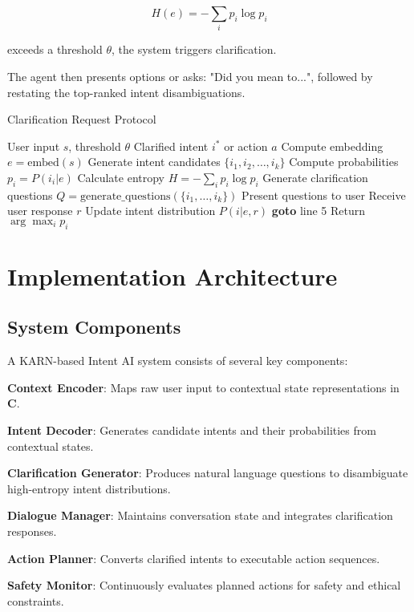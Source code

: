 \documentclass[12pt]{article}
\begin{document}
$$H(e) = -\sum_i p_i \log p_i$$

exceeds a threshold $\theta$, the system triggers clarification.

The agent then presents options or asks: "Did you mean to...", followed by restating the top-ranked intent disambiguations.

\begin{algorithm}
\caption{Clarification Request Protocol}
\begin{algorithmic}[1]
\REQUIRE User input $s$, threshold $\theta$
\ENSURE Clarified intent $i^*$ or action $a$
\STATE Compute embedding $e = \text{embed}(s)$
\STATE Generate intent candidates $\{i_1, i_2, \ldots, i_k\}$
\STATE Compute probabilities $p_i = P(i_i | e)$
\STATE Calculate entropy $H = -\sum_i p_i \log p_i$
    \STATE Generate clarification questions $Q = \text{generate\_questions}(\{i_1, \ldots, i_k\})$
    \STATE Present questions to user
    \STATE Receive user response $r$
    \STATE Update intent distribution $P(i | e, r)$
    \STATE \textbf{goto} line 5
\ELSE
    \STATE Return $\arg\max_i p_i$
\ENDIF
\end{algorithmic}
\end{algorithm}

\section{Implementation Architecture}

\subsection{System Components}

A KARN-based Intent AI system consists of several key components:

\textbf{Context Encoder}: Maps raw user input to contextual state representations in $\mathbf{C}$.

\textbf{Intent Decoder}: Generates candidate intents and their probabilities from contextual states.

\textbf{Clarification Generator}: Produces natural language questions to disambiguate high-entropy intent distributions.

\textbf{Dialogue Manager}: Maintains conversation state and integrates clarification responses.

\textbf{Action Planner}: Converts clarified intents to executable action sequences.

\textbf{Safety Monitor}: Continuously evaluates planned actions for safety and ethical constraints.
\end{document}

